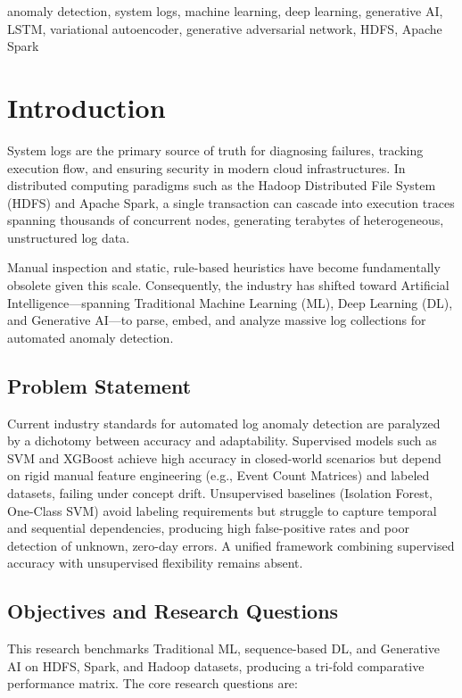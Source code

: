 \documentclass[conference]{IEEEtran}
\begin{document}
\begin{IEEEkeywords}
anomaly detection, system logs, machine learning, deep learning, generative AI, LSTM, variational autoencoder, generative adversarial network, HDFS, Apache Spark
\end{IEEEkeywords}

\section{Introduction}
System logs are the primary source of truth for diagnosing failures, tracking execution flow, and ensuring security in modern cloud infrastructures. In distributed computing paradigms such as the Hadoop Distributed File System (HDFS) and Apache Spark, a single transaction can cascade into execution traces spanning thousands of concurrent nodes, generating terabytes of heterogeneous, unstructured log data.

Manual inspection and static, rule-based heuristics have become fundamentally obsolete given this scale. Consequently, the industry has shifted toward Artificial Intelligence---spanning Traditional Machine Learning (ML), Deep Learning (DL), and Generative AI---to parse, embed, and analyze massive log collections for automated anomaly detection.

\subsection{Problem Statement}
Current industry standards for automated log anomaly detection are paralyzed by a dichotomy between accuracy and adaptability. Supervised models such as SVM and XGBoost achieve high accuracy in closed-world scenarios but depend on rigid manual feature engineering (e.g., Event Count Matrices) and labeled datasets, failing under concept drift. Unsupervised baselines (Isolation Forest, One-Class SVM) avoid labeling requirements but struggle to capture temporal and sequential dependencies, producing high false-positive rates and poor detection of unknown, zero-day errors. A unified framework combining supervised accuracy with unsupervised flexibility remains absent.

\subsection{Objectives and Research Questions}
This research benchmarks Traditional ML, sequence-based DL, and Generative AI on HDFS, Spark, and Hadoop datasets, producing a tri-fold comparative performance matrix. The core research questions are:
\end{document}
